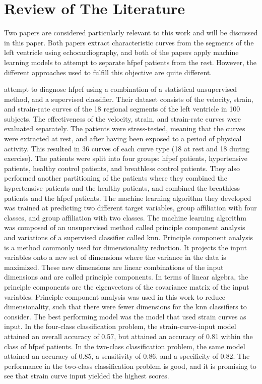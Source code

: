\chapter{Review of The Literature} \label{chap:lit}

Two papers are considered particularly relevant to this work and will be discussed in this paper. Both papers extract characteristic curves from the segments of the left ventricle using echocardiography, and both of the papers apply machine learning models to attempt to separate \acrshort{hfpef} patients from the rest. However, the different approaches used to fulfill this objective are quite different. 

\textcite{hf_diagnosis_ml} attempt to diagnose \acrshort{hfpef} using a combination of a statistical unsupervised method, and a supervised classifier. Their dataset consists of the velocity, strain, and strain-rate curves of the 18 regional segments of the left ventricle in 100 subjects. The effectiveness of the velocity, strain, and strain-rate curves were evaluated separately. The patients were stress-tested, meaning that the curves were extracted at rest, and after having been exposed to a period of physical activity. This resulted in 36 curves of each curve type (18 at rest and 18 during exercise). The patients were split into four groups: \acrshort{hfpef} patients, hypertensive patients, healthy control patients, and breathless control patients. They also performed another partitioning of the patients where they combined the hypertensive patients and the healthy patients, and combined the breathless patients and the \acrshort{hfpef} patients. The machine learning algorithm they developed was trained at predicting two different target variables, group affiliation with four classes, and group affiliation with two classes. The machine learning algorithm was composed of an unsupervised method called principle component analysis and variations of a supervised classifier called \acrfull{knn}. Principle component analysis is a method commonly used for dimensionality reduction. It projects the input variables onto a new set of dimensions where the variance in the data is maximized. These new dimensions are linear combinations of the input dimensions and are called principle components. In terms of linear algebra, the principle components are the eigenvectors of the covariance matrix of the input variables. Principle component analysis was used in this work to reduce dimensionality, such that there were fewer dimensions for the \acrshort{knn} classifiers to consider. The best performing model was the model that used strain curves as input. In the four-class classification problem, the strain-curve-input model attained an overall accuracy of 0.57, but attained an accuracy of 0.81 within the class of \acrshort{hfpef} patients. In the two-class classification problem, the same model attained an accuracy of 0.85, a sensitivity of 0.86, and a specificity of 0.82. The performance in the two-class classification problem is good, and it is promising to see that strain curve input yielded the highest scores. \bigskip

